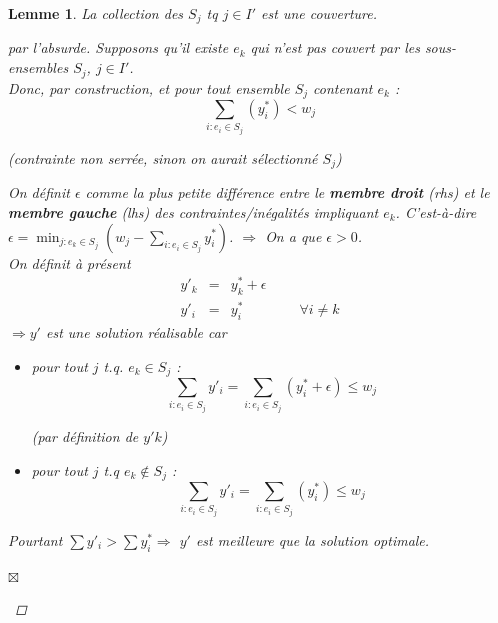 \documentclass[12pt]{article}
\newcommand{\contrad}{\begin{flushright}$\boxtimes$\end{flushright}}
\newtheorem{lemme}{Lemme}[section]
\newtheorem{proof}{Preuve}[section]
\begin{document}
\begin{lemme}
La collection des $S_j$ tq $j\in I'$ est une couverture.$ $\\
\begin{proof}[par l'absurde]
Supposons qu'il existe $e_k$ qui n'est pas couvert par les sous-ensembles $S_j$,
$j\in I'$.\\
Donc, par construction, et pour tout ensemble $S_j$ contenant $e_k$ :
$$\sum_{i : e_i \in S_j}(y^*_i) < w_j $$
\begin{center}
\textit{(contrainte non serrée, sinon on aurait sélectionné $S_j$)}
\end{center}

On définit $\epsilon$ comme la plus petite différence entre le \textbf{membre
droit} \textit{(rhs)} et le \textbf{membre gauche}
\textit{(lhs)} des contraintes/inégalités impliquant $e_k$.
C'est-à-dire
$\epsilon = \min_{j:e_k \in S_j} {(w_j - \sum_{i : e_i \in S_j} y^*_i)}$.
$\Rightarrow$ On a que $\boxed{\epsilon > 0}$. \\

On définit à présent
\begin{eqnarray}
y'_k & = & y^*_k+\epsilon \\
y'_i & = & y^*_i\qquad\qquad \forall i \neq k
\end{eqnarray}
$\Rightarrow y'$ est une solution réalisable car
\begin{itemize}
\item pour tout $j$ t.q. $e_k \in S_j$ :
$$\sum_{i:e_i\in S_j} y'_i = \sum_{i:e_i\in S_j}(y^*_i+\epsilon) \leq w_j$$
\begin{center} \textit{(par définition de $y'k$)} \end{center}
\item pour tout $j$ t.q $e_k \not\in S_j$ :
$$\sum_{i:e_i\in S_j} y'_i = \sum_{i:e_i\in S_j}(y^*_i) \leq w_j$$
\end{itemize}
Pourtant $\sum y'_i > \sum y^*_i \Rightarrow$ $y'$ est meilleure que la solution
optimale.
\contrad
\end{proof}
\end{lemme}
\end{document}
